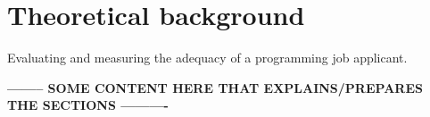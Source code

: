 \documentclass[11pt,a4paper,oneside,article]{memoir}
\begin{document}
\newpage

\chapter{Theoretical background}

Evaluating and measuring the adequacy of a programming job applicant.

\textbf{-------- SOME CONTENT HERE THAT EXPLAINS/PREPARES THE SECTIONS ----------}



\end{document}
